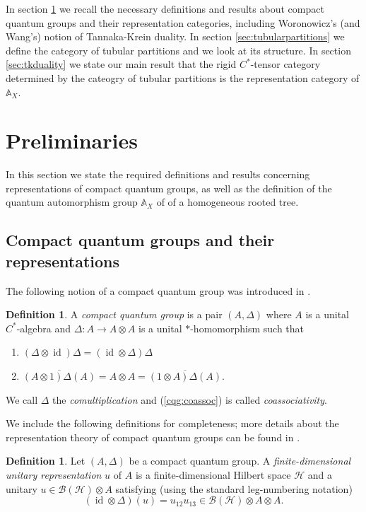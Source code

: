 \documentclass[12pt, a4paper]{amsart}
\def\id{\operatorname{id}}
\def\A{\mathbb{A}}
\def\BB{\mathcal{B}}
\def\HH{\mathcal{H}}
\theoremstyle{definition}
\newtheorem{definition}[thm]{Definition}
\theoremstyle{remark}
\numberwithin{equation}{section}
\begin{document}
In section \ref{sec:prelims} we recall the necessary definitions and results about compact quantum groups and their representation categories, including Woronowicz's (and Wang's) notion of Tannaka-Krein duality. In section \ref{sec:tubularpartitions} we define the category of tubular partitions and we look at its structure. In section \ref{sec:tkduality} we state our main result that the rigid $C^*$-tensor category determined by the cateogry of tubular partitions is the representation category of $\A_X$.

\section{Preliminaries} \label{sec:prelims}

In this section we state the required definitions and results concerning representations of compact quantum groups, as well as the definition of the quantum automorphism group $\mathbb{A}_X$ of of a homogeneous rooted tree.  

\subsection{Compact quantum groups and their representations}

The following notion of a compact quantum group was introduced in \cite{Wor95}. 

\begin{definition} \cite[Definition 1]{Wor95} \label{CQG:densitydefn}
	A \emph{compact quantum group} is a pair $(A,\Delta)$ where $A$ is a unital $C^*$-algebra and $\Delta : A \to A \otimes A$ is a unital $*$-homomorphism such that
	\begin{enumerate}
		\item \label{cqg:coassoc} $(\Delta\otimes \id)\Delta = (\id\otimes\Delta) \Delta$
		\item $\overline{(A\otimes 1)\Delta(A)} = A \otimes A = \overline{(1\otimes A)\Delta(A)}$.
	\end{enumerate}
	We call $\Delta$ the \emph{comultiplication} and (\ref{cqg:coassoc}) is called \emph{coassociativity}.
\end{definition}

We include the following definitions for completeness; more details about the representation theory of compact quantum groups can be found in \cite{NeshTuset}.

\begin{definition}
Let $(A,\Delta)$ be a compact quantum group. A \emph{finite-dimensional unitary representation} $u$ of $A$ is  a finite-dimensional Hilbert space $\HH$ and a unitary $u\in \BB(\HH)\otimes A$ satisfying (using the standard leg-numbering notation)
\begin{equation} \label{CQGrep}
(\id\otimes\Delta)(u) = u_{12}u_{13} \in \BB(\HH)\otimes A \otimes A.
\end{equation}
\end{definition}
\end{document}
